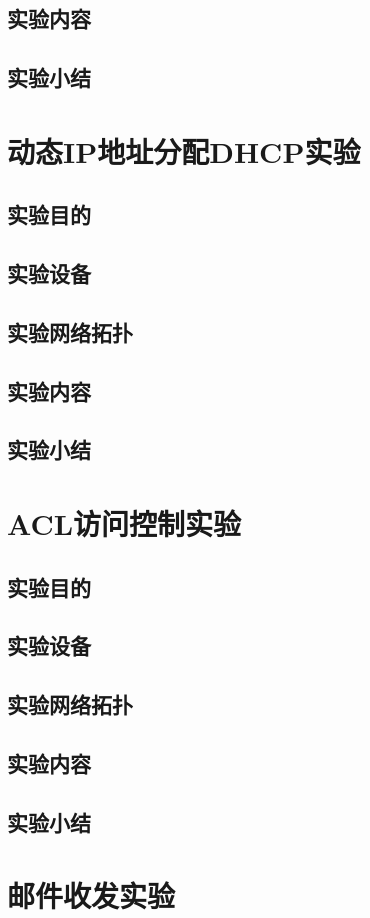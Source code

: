 \documentclass[lang=cn,11pt,a4paper,cite=authoryear]{elegantpaper}
\begin{document}
\subsection{实验内容}
\subsection{实验小结}
\section{动态IP地址分配DHCP实验}
\subsection{实验目的}
\subsection{实验设备}
\subsection{实验网络拓扑}
\subsection{实验内容}
\subsection{实验小结}
\section{ACL访问控制实验}
\subsection{实验目的}
\subsection{实验设备}
\subsection{实验网络拓扑}
\subsection{实验内容}
\subsection{实验小结}
\section{邮件收发实验}
\end{document}
